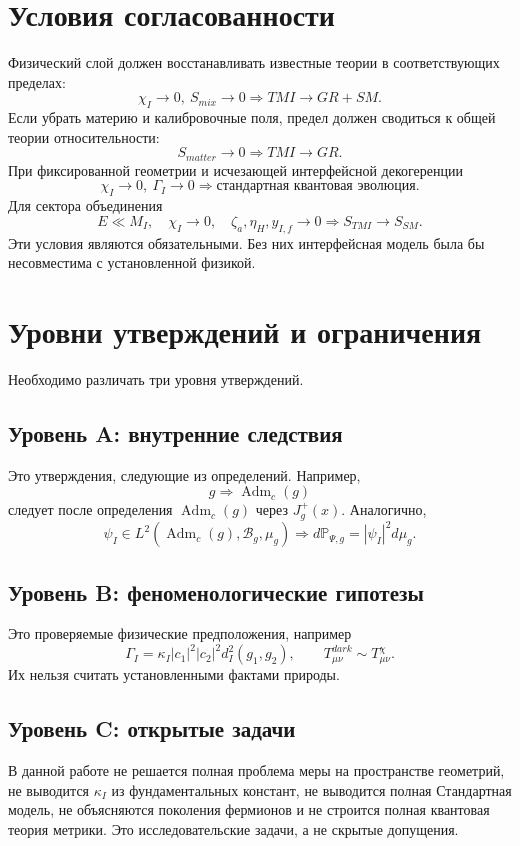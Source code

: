 \documentclass[12pt,a4paper]{article}
\DeclareMathOperator{\Adm}{Adm}
\newcommand{\Prob}{\mathbb P}
\begin{document}
\section{Условия согласованности}
Физический слой должен восстанавливать известные теории в соответствующих пределах:
\[
\boxed{\chi_I\to0,\ S_{mix}\to0\Rightarrow TMI\to GR+SM.}
\]
Если убрать материю и калибровочные поля, предел должен сводиться к общей теории относительности:
\[
\boxed{S_{matter}\to0\Rightarrow TMI\to GR.}
\]
При фиксированной геометрии и исчезающей интерфейсной декогеренции
\[
\boxed{\chi_I\to0,\ \Gamma_I\to0\Rightarrow \text{стандартная квантовая эволюция}.}
\]
Для сектора объединения
\[
\boxed{E\ll M_I,
\quad \chi_I\to0,
\quad \zeta_a,\eta_H,y_{I,f}\to0
\Rightarrow S_{TMI}\to S_{SM}.}
\]
Эти условия являются обязательными. Без них интерфейсная модель была бы несовместима с установленной физикой.

\section{Уровни утверждений и ограничения}
Необходимо различать три уровня утверждений.

\subsection*{Уровень A: внутренние следствия}
Это утверждения, следующие из определений. Например,
\[
g\Rightarrow\Adm_c(g)
\]
следует после определения $\Adm_c(g)$ через $J_g^+(x)$. Аналогично,
\[
\psi_I\in L^2(\Adm_c(g),\mathcal B_g,\mu_g)
\Rightarrow
 d\Prob_{\Psi,g}=|\psi_I|^2d\mu_g.
\]

\subsection*{Уровень B: феноменологические гипотезы}
Это проверяемые физические предположения, например
\[
\Gamma_I=\kappa_I|c_1|^2|c_2|^2d_I^2(g_1,g_2),
\qquad
T_{\mu\nu}^{dark}\sim T_{\mu\nu}^{\chi}.
\]
Их нельзя считать установленными фактами природы.

\subsection*{Уровень C: открытые задачи}
В данной работе не решается полная проблема меры на пространстве геометрий, не выводится $\kappa_I$ из фундаментальных констант, не выводится полная Стандартная модель, не объясняются поколения фермионов и не строится полная квантовая теория метрики. Это исследовательские задачи, а не скрытые допущения.
\end{document}
